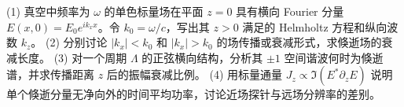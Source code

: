 (1) 真空中频率为 \(\omega\) 的单色标量场在平面 \(z=0\) 具有横向 Fourier 分量 \(E(x,0)=E_0e^{ik_xx}\)。令 \(k_0=\omega/c\)，写出其 \(z>0\) 满足的 Helmholtz 方程和纵向波数 \(k_z\)。
(2) 分别讨论 \(|k_x|<k_0\) 和 \(|k_x|>k_0\) 的场传播或衰减形式，求倏逝场的衰减长度。
(3) 对一个周期 \(\Lambda\) 的正弦横向结构，分析其 \(\pm1\) 空间谐波何时为倏逝谱，并求传播距离 \(z\) 后的振幅衰减比例。
(4) 用标量通量 \(J_z\propto\Im(E^*\partial_zE)\) 说明单个倏逝分量无净向外的时间平均功率，讨论近场探针与远场分辨率的差别。
